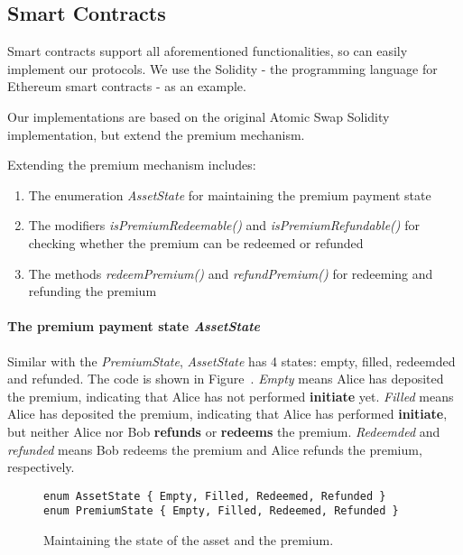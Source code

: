 \subsection{Smart Contracts}

Smart contracts support all aforementioned functionalities, so can easily implement our protocols.
We use the Solidity - the programming language for Ethereum smart contracts - as an example.

Our implementations are based on the original Atomic Swap Solidity implementation,
but extend the premium mechanism.

Extending the premium mechanism includes:

\begin{enumerate}
    \item The enumeration \textit{AssetState} for maintaining the premium payment state
    \item The modifiers \textit{isPremiumRedeemable()} and \textit{isPremiumRefundable()} for checking whether the premium can be redeemed or refunded
    \item The methods \textit{redeemPremium()} and \textit{refundPremium()} for redeeming and refunding the premium
\end{enumerate}

\paragraph{The premium payment state \textit{AssetState}}

Similar with the \textit{PremiumState}, \textit{AssetState} has 4 states: empty, filled, redeemded and refunded.
The code is shown in Figure~\cite{code:state}.
\textit{Empty} means Alice has  deposited the premium, indicating that Alice has not performed \textbf{initiate} yet.
\textit{Filled} means Alice has deposited the premium, indicating that Alice has performed \textbf{initiate}, but neither Alice nor Bob \textbf{refunds} or \textbf{redeems} the premium.
\textit{Redeemded} and \textit{refunded} means Bob redeems the premium and Alice refunds the premium, respectively. 

\begin{figure}
\begin{lstlisting}[language=Solidity, basicstyle=\tiny]
enum AssetState { Empty, Filled, Redeemed, Refunded }
enum PremiumState { Empty, Filled, Redeemed, Refunded }
\end{lstlisting}
\label{code:state}
\caption{Maintaining the state of the asset and the premium.}
\end{figure}


